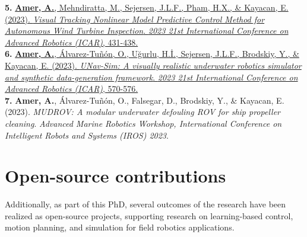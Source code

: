 \textbf{5.} \href{https://ieeexplore.ieee.org/document/10406329}{\textbf{Amer, A.}, Mehndiratta, M., Sejersen, J.L.F., Pham, H.X., \& Kayacan, E. (2023). \textit{Visual Tracking Nonlinear Model Predictive Control Method for Autonomous Wind Turbine Inspection}. \textit{2023 21st International Conference on Advanced Robotics (ICAR)}, 431-438.}\\[0.8em]

\textbf{6.} \href{https://ieeexplore.ieee.org/abstract/document/10406819}{\textbf{Amer, A.}, Álvarez-Tuñón, O., Uğurlu, H.İ., Sejersen, J.L.F., Brodskiy, Y., \& Kayacan, E. (2023). \textit{UNav-Sim: A visually realistic underwater robotics simulator and synthetic data-generation framework}. \textit{2023 21st International Conference on Advanced Robotics (ICAR)}, 570-576.}\\[0.8em]

\textbf{7.} \textbf{Amer, A.}, Álvarez-Tuñón, O., Falsegar, D., Brodskiy, Y., \& Kayacan, E. (2023). \textit{MUDROV: A modular underwater defouling ROV for ship propeller cleaning}. \textit{Advanced Marine Robotics Workshop, International Conference on Intelligent Robots and Systems (IROS) 2023}.



\section*{Open-source contributions}

Additionally, as part of this PhD, several outcomes of the research have been realized as open-source projects, supporting research on learning-based control, motion planning, and simulation for field robotics applications.



